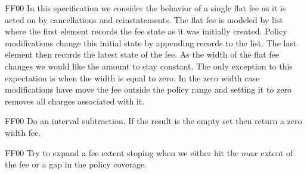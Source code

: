\tlatex
{}
\@x{}\moduleLeftDash{}\moduleRightDash\@xx{}%
\@pvspace{8.0pt}%
%
%
\@pvspace{8.0pt}%
\begin{lcom}{7.5}%
\begin{cpar}{0}{F}{F}{0}{0}{}%
 In this specification we consider the behavior of a single flat fee as it is
 acted on
 by cancellations and reinstatements. The flat fee is modeled by list where
 the first
 element records the fee state as it was initially created. Policy
 modifications change
 this initial state by appending records to the list. The last element then
 records
 the latest state of the fee.
 As the width of the flat fee changes we would like the amount to stay
 constant. The
 only exception to this expectation is when the width is equal to zero. In
 the zero
 width case modifications have move the fee outside the policy range and
 setting it to
 zero removes all charges associated with it.
\end{cpar}%
\end{lcom}%
\@x{}\midbar\@xx{}%
%
\@pvspace{8.0pt}%
\@pvspace{8.0pt}%
\begin{lcom}{7.5}%
\begin{cpar}{0}{F}{F}{0}{0}{}%
 Do an interval subtraction. If the result is the empty set then return a zero
 width
 fee.
\end{cpar}%
\end{lcom}%
%
%
\@pvspace{8.0pt}%
\begin{lcom}{7.5}%
\begin{cpar}{0}{F}{F}{0}{0}{}%
 Try to expand a fee extent stoping when we either hit the \ensuremath{max}
 extent of the fee or a
 gap in the policy coverage.
\end{cpar}%
\end{lcom}%
%
%
